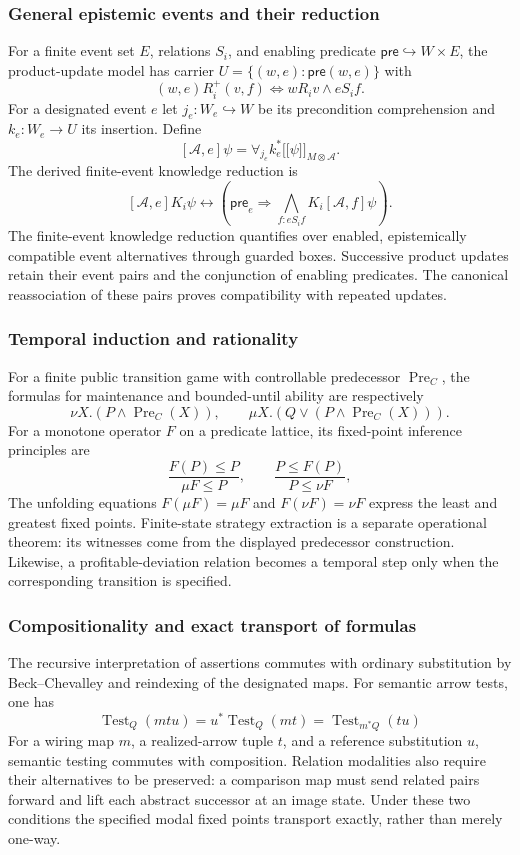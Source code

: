 \documentclass[11pt,a4paper]{article}
\numberwithin{equation}{section}
\theoremstyle{definition}
\theoremstyle{remark}
\theoremstyle{plain}
\providecommand{\llbracket}{\mathopen{[\![}}
\providecommand{\rrbracket}{\mathclose{]\!]}}
\begin{document}
\subsubsection{General epistemic events and their reduction}

For a finite event set $E$, relations $S_i$, and enabling predicate
$\mathsf{pre}\hookrightarrow W\times E$, the product-update model has
carrier $U=\{(w,e):\mathsf{pre}(w,e)\}$ with
\[
(w,e)R_i^+(v,f)
\iff wR_iv\wedge eS_if.
\]
For a designated event $e$ let $j_e:W_e\hookrightarrow W$ be its
precondition comprehension and $k_e:W_e\to U$ its insertion.  Define
\[
[\mathcal A,e]\psi
=\forall_{j_e}k_e^*\llbracket\psi\rrbracket_{M\otimes\mathcal A}.
\]
The derived finite-event knowledge reduction is
\[
[\mathcal A,e]K_i\psi
\leftrightarrow
\left(\mathsf{pre}_e\Rightarrow
\bigwedge_{f:eS_if}K_i[\mathcal A,f]\psi\right).
\]
The finite-event knowledge reduction quantifies over enabled,
epistemically compatible event alternatives through guarded boxes.
Successive product updates retain their event pairs and the
conjunction of enabling predicates. The canonical reassociation of
these pairs proves compatibility with repeated updates.

\subsubsection{Temporal induction and rationality}

For a finite public transition game with controllable predecessor
$\operatorname{Pre}_C$, the formulas for maintenance and bounded-until
ability are respectively
\[
\nu X.(P\wedge\operatorname{Pre}_C(X)),
\qquad
\mu X.(Q\vee(P\wedge\operatorname{Pre}_C(X))).
\]
For a monotone operator $F$ on a predicate lattice, its fixed-point
inference principles are
\[
\frac{F(P)\leq P}{\mu F\leq P},
\qquad
\frac{P\leq F(P)}{P\leq\nu F},
\]
The unfolding equations $F(\mu F)=\mu F$ and
$F(\nu F)=\nu F$ express the least and greatest fixed points.
Finite-state strategy extraction is a separate operational theorem:
its witnesses come from the displayed predecessor construction.
Likewise, a profitable-deviation relation becomes a temporal step
only when the corresponding transition is specified.

\subsubsection{Compositionality and exact transport of formulas}

The recursive interpretation of assertions commutes with ordinary
substitution by Beck--Chevalley and reindexing of the designated maps.
For semantic arrow tests, one has
\[
\operatorname{Test}_{Q}(mtu)
=u^*\operatorname{Test}_{Q}(mt)
=\operatorname{Test}_{m^*Q}(tu)
\]
For a wiring map $m$, a realized-arrow tuple $t$, and a reference
substitution $u$, semantic testing commutes with composition. Relation
modalities also require their alternatives to be preserved: a
comparison map must send related pairs forward and lift each abstract
successor at an image state. Under these two conditions the specified
modal fixed points transport exactly, rather than merely one-way.
\end{document}
